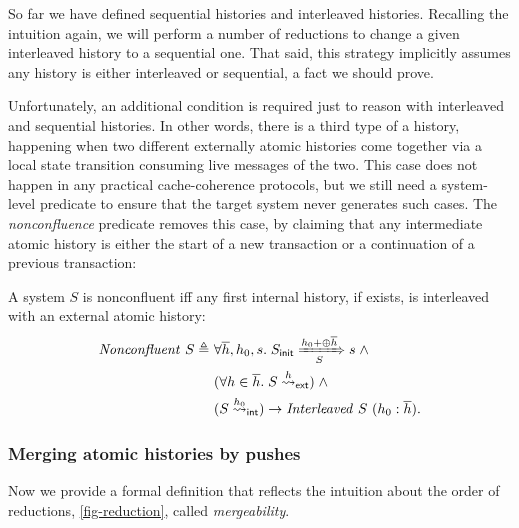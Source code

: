 \documentclass[sigplan,10pt,review,anonymous,screen]{acmart}\settopmatter{printfolios=true,printccs=false,printacmref=false}
\begin{document}
So far we have defined sequential histories and interleaved histories.
Recalling the intuition again, we will perform a number of reductions to change a given interleaved history to a sequential one.
That said, this strategy implicitly assumes any history is either interleaved or sequential, a fact we should prove.

Unfortunately, an additional condition is required just to reason with interleaved and sequential histories.
In other words, there is a third type of a history, happening when two different externally atomic histories come together via a local state transition consuming live messages of the two.
This case does not happen in any practical cache-coherence protocols, but we still need a system-level predicate to ensure that the target system never generates such cases.
The \emph{nonconfluence} predicate removes this case, by claiming that any intermediate atomic history is either the start of a new transaction or a continuation of a previous transaction:
\newcommand{\sncf}[1]{\ensuremath{\mathit{Nonconfluent}\ #1}}
\begin{definition}[Nonconfluence]
  A system $S$ is nonconfluent iff any first internal history, if exists, is
  interleaved with an external atomic history:
  \begin{align*}
    \sncf{S} \triangleq\ & \forall \listof{h}, h_0, s.\; \semsteps{S}{\sysInit{S}}{\listapp{h_0}{\listconcat{\listof{h}}}}{s} \; \land \\
    & (\forall h \in \listof{h}.\; \extatomicshort{S}{h}) \; \land \\
    & (\intatomicshort{S}{h_0}) \to \hitlv{S}{(\listcons{h_0}{\listof{h}})}.
  \end{align*}
\end{definition}

\subsubsection{Merging atomic histories by pushes}

\newcommand{\hmgb}[3]{\ensuremath{#1 \vdash #2 \hookrightarrow #3}}
\newcommand{\smgb}[1]{\ensuremath{\mathit{Mergeable}\ #1}}

Now we provide a formal definition that reflects the intuition about the order of reductions, \autoref{fig-reduction}, called \emph{mergeability}.
\end{document}
